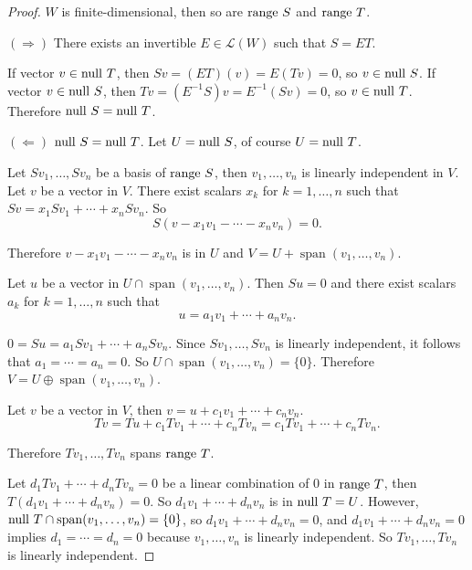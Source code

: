 \begin{proof}
    $W$ is finite-dimensional, then so are $\operatorname{range}\,{S}$ and $\operatorname{range}\,{T}$.

    $(\Rightarrow)$ There exists an invertible $E \in \mathcal{L}(W)$ such that $S = ET$.

    If vector $v\in\operatorname{null}\,{T}$, then $Sv = (ET)(v) = E(Tv) = 0$, so $v\in\operatorname{null}\,{S}$. If vector $v\in\operatorname{null}\,{S}$, then $Tv = (E^{-1}S)v = E^{-1}(Sv) = 0$, so $v\in\operatorname{null}\,{T}$. Therefore $\operatorname{null}\,{S} = \operatorname{null}\,{T}$.

    $(\Leftarrow)$ $\operatorname{null}\,{S} = \operatorname{null}\,{T}$. Let $U = \operatorname{null}\,{S}$, of course $U = \operatorname{null}\,{T}$.

    Let $Sv_{1}, \ldots, Sv_{n}$ be a basis of $\operatorname{range}\,{S}$, then $v_{1}, \ldots, v_{n}$ is linearly independent in $V$. Let $v$ be a vector in $V$. There exist scalars $x_{k}$ for $k = 1,\ldots, n$ such that $Sv = x_{1}Sv_{1} + \cdots + x_{n}Sv_{n}$. So
    \[
        S(v - x_{1}v_{1} - \cdots - x_{n}v_{n}) = 0.
    \]

    Therefore $v - x_{1}v_{1} - \cdots - x_{n}v_{n}$ is in $U$ and $V = U + \operatorname{span}(v_{1}, \ldots, v_{n})$.

    Let $u$ be a vector in $U\cap \operatorname{span}(v_{1}, \ldots, v_{n})$. Then $Su = 0$ and there exist scalars $a_{k}$ for $k = 1,\ldots, n$ such that
    \[
        u = a_{1}v_{1} + \cdots + a_{n}v_{n}.
    \]

    $0 = Su = a_{1}Sv_{1} + \cdots + a_{n}Sv_{n}$. Since $Sv_{1}, \ldots, Sv_{n}$ is linearly independent, it follows that $a_{1} = \cdots = a_{n} = 0$. So $U\cap \operatorname{span}(v_{1}, \ldots, v_{n}) = \{ 0 \}$. Therefore $V = U \oplus \operatorname{span}(v_{1}, \ldots, v_{n})$.

    Let $v$ be a vector in $V$, then $v = u + c_{1}v_{1} + \cdots + c_{n}v_{n}$.
    \[
        Tv = Tu + c_{1}Tv_{1} + \cdots + c_{n}Tv_{n} = c_{1}Tv_{1} + \cdots + c_{n}Tv_{n}.
    \]

    Therefore $Tv_{1}, \ldots, Tv_{n}$ spans $\operatorname{range}\,{T}$.

    Let $d_{1}Tv_{1} + \cdots + d_{n}Tv_{n} = 0$ be a linear combination of $0$ in $\operatorname{range}\,{T}$, then $T(d_{1}v_{1} + \cdots + d_{n}v_{n}) = 0$. So $d_{1}v_{1} + \cdots + d_{n}v_{n}$ is in $\operatorname{null}\,{T} = U$. However, $\operatorname{null}\,{T}\cap\operatorname{span}(v_{1}, \ldots, v_{n}) = \{0\}$, so $d_{1}v_{1} + \cdots + d_{n}v_{n} = 0$, and $d_{1}v_{1} + \cdots + d_{n}v_{n} = 0$ implies $d_{1} = \cdots = d_{n} = 0$ because $v_{1}, \ldots, v_{n}$ is linearly independent. So $Tv_{1}, \ldots, Tv_{n}$ is linearly independent.


\end{proof}
